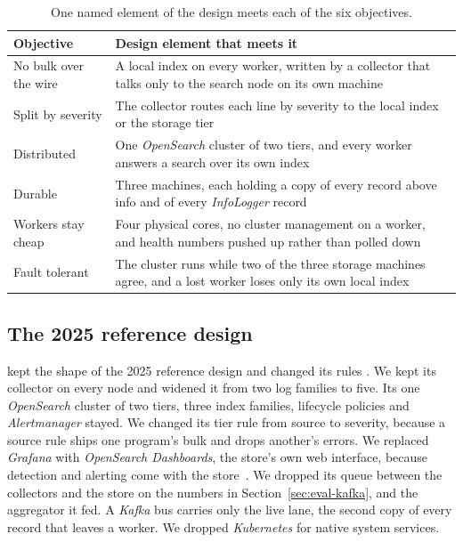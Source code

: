 \begin{table}[htbp]\caption{One named element of the design meets each of the six objectives.}\label{tab:objectives}\centering\footnotesize
\begin{tabularx}{\textwidth}{L{0.22\textwidth} X}
\toprule
Objective & Design element that meets it \\
\midrule
No bulk over the wire & A local index on every worker, written by a collector that talks only to the search node on its own machine \\
Split by severity & The collector routes each line by severity to the local index or the storage tier \\
Distributed & One \textit{OpenSearch} cluster of two tiers, and every worker answers a search over its own index \\
Durable & Three machines, each holding a copy of every record above info and of every \textit{InfoLogger} record \\
Workers stay cheap & Four physical cores, no cluster management on a worker, and health numbers pushed up rather than polled down \\
Fault tolerant & The cluster runs while two of the three storage machines agree, and a lost worker loses only its own local index \\
\bottomrule
\end{tabularx}
\end{table}

\subsection{The 2025 reference design}\label{sec:problem-reference}

\loggy{} kept the shape of the 2025 reference design and changed its rules \cite{ref:papadopoulos2025}. We kept its collector on every node and widened it from two log families to five. Its one \textit{OpenSearch} cluster of two tiers, three index families, lifecycle policies and \textit{Alertmanager} stayed. We changed its tier rule from source to severity, because a source rule ships one program's bulk and drops another's errors. We replaced \textit{Grafana} with \textit{OpenSearch Dashboards}, the store's own web interface, because detection and alerting come with the store~\cite{ref:opensearch}. We dropped its queue between the collectors and the store on the numbers in Section~\ref{sec:eval-kafka}, and the aggregator it fed. A \textit{Kafka} bus carries only the live lane, the second copy of every record that leaves a worker. We dropped \textit{Kubernetes} for native system services.
